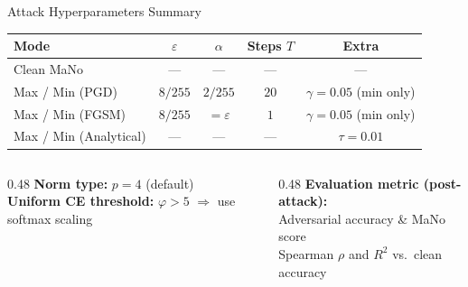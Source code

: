 \documentclass[aspectratio=169]{beamer}
\newcommand{\Phi}{\varphi}
\begin{document}
\begin{frame}{Attack Hyperparameters Summary}

\begin{table}
\centering
\renewcommand{\arraystretch}{1.4}
\begin{tabular}{lcccc}
\toprule
\textbf{Mode} & $\varepsilon$ & $\alpha$ & \textbf{Steps} $T$ & \textbf{Extra} \\
\midrule
\textcolor{cleancolor}{Clean MaNo}
  & --- & --- & --- & --- \\[2pt]
\textcolor{maxcolor}{Max / Min (PGD)}
  & $8/255$ & $2/255$ & $20$
  & $\gamma = 0.05$ (min only) \\[2pt]
\textcolor{maxcolor}{Max / Min (FGSM)}
  & $8/255$ & $= \varepsilon$ & $1$
  & $\gamma = 0.05$ (min only) \\[2pt]
\textcolor{maxcolor}{Max / Min (Analytical)}
  & --- & --- & ---
  & $\tau = 0.01$ \\
\bottomrule
\end{tabular}
\end{table}

\medskip
\begin{columns}[T]
\begin{column}{0.48\textwidth}
  \textbf{Norm type:} $p = 4$ (default)\\
  \textbf{Uniform CE threshold:} $\Phi > 5$ $\Rightarrow$ use softmax scaling
\end{column}
\begin{column}{0.48\textwidth}
  \textbf{Evaluation metric (post-attack):}\\
  \quad Adversarial accuracy \& MaNo score\\
  \quad Spearman $\rho$ and $R^2$ vs.\ clean accuracy
\end{column}
\end{columns}

\end{frame}
\end{document}
